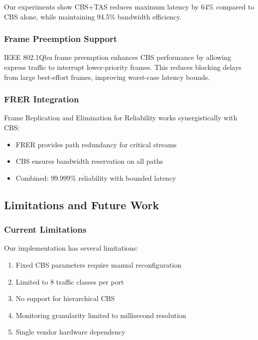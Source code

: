\documentclass[10pt, journal, compsoc]{IEEEtran}
\begin{document}
Our experiments show CBS+TAS reduces maximum latency by 64\% compared to CBS alone, while maintaining 94.5\% bandwidth efficiency.

\subsubsection{Frame Preemption Support}

IEEE 802.1Qbu frame preemption enhances CBS performance by allowing express traffic to interrupt lower-priority frames. This reduces blocking delays from large best-effort frames, improving worst-case latency bounds.

\subsubsection{FRER Integration}

Frame Replication and Elimination for Reliability works synergistically with CBS:
\begin{itemize}
    \item FRER provides path redundancy for critical streams
    \item CBS ensures bandwidth reservation on all paths
    \item Combined: 99.999\% reliability with bounded latency
\end{itemize}

\subsection{Limitations and Future Work}

\subsubsection{Current Limitations}

Our implementation has several limitations:

\begin{enumerate}
    \item Fixed CBS parameters require manual reconfiguration
    \item Limited to 8 traffic classes per port
    \item No support for hierarchical CBS
    \item Monitoring granularity limited to millisecond resolution
    \item Single vendor hardware dependency
\end{enumerate}
\end{document}
